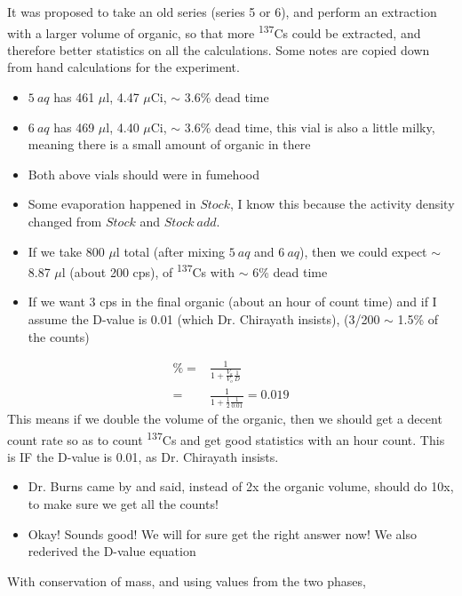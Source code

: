 \documentclass[idxtotoc,hyperref,openany,oneside]{labbook} %
\newcommand{\tss}{\textsuperscript}
\begin{document}
It was proposed to take an old series (series 5 or 6), and
perform an extraction with a larger volume of organic,
so that more \tss{137}Cs could be extracted, and therefore
better statistics on all the calculations. Some notes
are copied down from hand calculations for the experiment.
\begin{itemize}
\item{$\boxed{5\ aq}$ has 461 $\mu$l, 4.47 $\mu$Ci, $\sim$ 3.6\% dead time}
\item{$\boxed{6\ aq}$ has 469 $\mu$l, 4.40 $\mu$Ci, $\sim$ 3.6\% dead time,
  this vial is also a little milky, meaning there is a small amount
  of organic in there}
\item{Both above vials should were in fumehood}
\item{Some evaporation happened in $\boxed{Stock}$,
  I know this because the activity density changed from
  $\boxed{Stock}$ and $\boxed{Stock\ add}$.}
\item{If we take 800 $\mu$l total (after mixing $\boxed{5\ aq}$
  and $\boxed{6\ aq}$), then we could expect $\sim$ 8.87 $\mu$l
  (about 200 cps),
  of \tss{137}Cs with $\sim$ 6\% dead time}
\item{If we want 3 cps in the final organic
  (about an hour of count time) and if I assume the D-value
  is 0.01 (which Dr. Chirayath insists), (3/200 $\sim$ 1.5\%
  of the counts)}
\end{itemize}
\begin{align*}
  \%=&\frac{1}{1+\frac{V_a}{V_o}\frac{1}{D}}\\
  =&\frac{1}{1+\frac{1}{2}\frac{1}{0.01}}=0.019
\end{align*}
This means if we double the volume of the organic, then
we should get a decent count rate so as to count \tss{137}Cs
and get good statistics with an hour count. This is IF
the D-value is 0.01, as Dr. Chirayath insists.
\begin{itemize}
\item{Dr. Burns came by and said, instead of 2x the organic volume,
  should do 10x, to make sure we get all the counts!}
\item{Okay! Sounds good! We will for sure get the right answer
  now! We also rederived the D-value equation}
\end{itemize}
With conservation of mass, and using values from the two phases,
\end{document}
